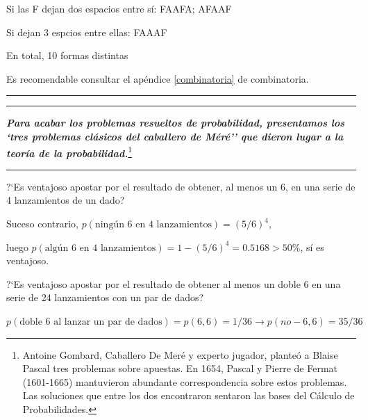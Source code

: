 \textcolor{gris}{Si las F dejan dos espacios entre sí: FAAFA; AFAAF}

\textcolor{gris}{Si dejan 3 espcios entre ellas: FAAAF}

\textcolor{gris}{En total, 10 formas distintas}

\textcolor{gris}{Es recomendable consultar el apéndice \ref{combinatoria} de combinatoria.}
 
\begin{flushright} \rule{100mm}{0.1mm} \end{flushright}

\vspace{1cm}

\begin{adjustwidth}{50pt}{50pt}
	\textcolor{gris}{\rule{70mm}{0.1mm}}
	
	\begin{destacado}
	\textbf{\emph{Para acabar los problemas resueltos de probabilidad, presentamos los `tres problemas clásicos del caballero de Méré'' que dieron lugar a la teoría de la probabilidad.}}\footnote{Antoine Gombard, Caballero De Meré y experto jugador, planteó a  Blaise Pascal tres problemas sobre apuestas. En 1654, Pascal y Pierre de Fermat (1601-1665) mantuvieron abundante correspondencia sobre estos problemas. Las soluciones que entre los dos encontraron sentaron las bases del Cálculo de Probabilidades.}
	\end{destacado}
	\begin{flushright}
	\rule{70mm}{0.1mm}	
	\end{flushright}
\end{adjustwidth}
\vspace{1cm}

\vspace{5mm}
\begin{ejemplo}
\begin{ejer}
?`Es ventajoso apostar por el resultado de obtener, al menos un 6, en una serie de 4 lanzamientos de un dado?
\end{ejer}
\end{ejemplo}
Suceso contrario, $p(\text{ningún 6 en 4 lanzamientos})=(5/6)^4$,

luego  $p(\text{algún 6 en 4 lanzamientos})=1-(5/6)^4=0.5168>50\%$, sí es ventajoso.

\vspace{5mm}
\begin{ejemplo}
\begin{ejer}
?`Es ventajoso apostar por el resultado de obtener al menos un doble 6 en una serie de 24 lanzamientos con un par de dados?	
\end{ejer}
\end{ejemplo}
$p(\text{doble 6 al lanzar un par de dados})=p(6,6)=1/36 \to p(no-6,6)=35/36$

